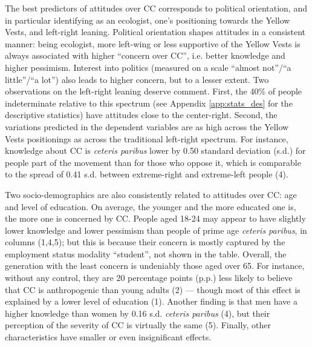 \documentclass[english,5p,authoryear]{elsarticle}
\begin{document}
The best predictors of attitudes over CC corresponds to political orientation, and in particular identifying as an ecologist, one's positioning towards the Yellow Vests, and left-right leaning. Political orientation shapes attitudes in a consistent manner: being ecologist, more left-wing or less supportive of the Yellow Vests is always associated with higher ``concern over CC'', i.e. better knowledge and higher pessimism. Interest into politics (measured on a scale ``almost not''/``a little''/``a lot'') also leads to higher concern, but to a lesser extent. Two observations on the left-right leaning deserve comment. First, the 40\% of people indeterminate relative to this spectrum (see Appendix \ref{app:stats_des} for the descriptive statistics) have attitudes close to the center-right. Second, the variations predicted in the dependent variables are as high across the Yellow Vests positionings as across the traditional left-right spectrum. For instance, knowledge about CC is \textit{ceteris paribus} lower by 0.50 standard deviation (s.d.) for people part of the movement than for those who oppose it, which is comparable to the spread of 0.41 s.d. between extreme-right and extreme-left people (4). 

Two socio-demographics are also consistently related to attitudes over CC: age and level of education. On average, the younger and the more educated one is, the more one is concerned by CC. People aged 18-24 may appear to have slightly lower knowledge and lower pessimism than people of prime age \textit{ceteris paribus}, in columns (1,4,5); but this is because their concern is mostly captured by the employment status modality ``student'', not shown in the table. Overall, the generation with the least concern is undeniably those aged over 65. For instance, without any control, they are 20 percentage points (p.p.) less likely to believe that CC is anthropogenic than young adults (2) --- though most of this effect is explained by a lower level of education (1). Another finding is that men have a higher knowledge than women by 0.16 s.d. \textit{ceteris paribus} (4), but their perception of the severity of CC is virtually the same (5). Finally, other characteristics have smaller or even insignificant effects. 
\end{document}
